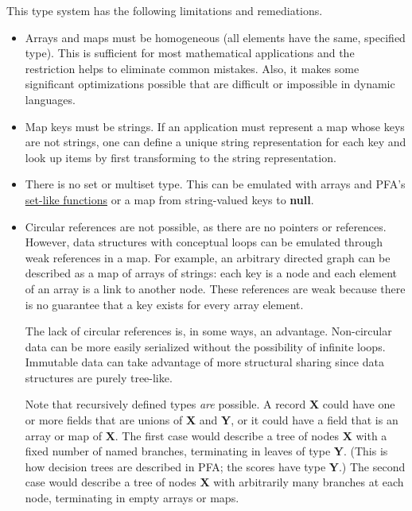\documentclass{article}
\newcommand{\PFAc}{\ttfamily\bfseries}
\newcommand{\PFAtp}{\ttfamily\bfseries}
\theoremstyle{definition}
\begin{document}
\noindent\begin{minipage}{\linewidth}
\indent This type system has the following limitations and remediations.
\begin{itemize}
\item Arrays and maps must be homogeneous (all elements have the same, specified type).  This is sufficient for most mathematical applications and the restriction helps to eliminate common mistakes.  Also, it makes some significant optimizations possible that are difficult or impossible in dynamic languages.
\end{itemize}
\end{minipage}

\vspace{-0.15 cm}
\begin{itemize}
\item Map keys must be strings.  If an application must represent a map whose keys are not strings, one can define a unique string representation for each key and look up items by first transforming to the string representation.

\item There is no set or multiset type.  This can be emulated with arrays and PFA's \hyperlink{hsec:set-like}{set-like functions} or a map from string-valued keys to {\PFAc null}.

\item Circular references are not possible, as there are no pointers or references.  However, data structures with conceptual loops can be emulated through weak references in a map.  For example, an arbitrary directed graph can be described as a map of arrays of strings: each key is a node and each element of an array is a link to another node.  These references are weak because there is no guarantee that a key exists for every array element.

The lack of circular references is, in some ways, an advantage.  Non-circular data can be more easily serialized without the possibility of infinite loops.  Immutable data can take advantage of more structural sharing since data structures are purely tree-like.

Note that recursively defined types {\it are} possible.  A record {\PFAtp X} could have one or more fields that are unions of {\PFAtp X} and {\PFAtp Y}, or it could have a field that is an array or map of {\PFAtp X}.  The first case would describe a tree of nodes {\PFAtp X} with a fixed number of named branches, terminating in leaves of type {\PFAtp Y}.  (This is how decision trees are described in PFA; the scores have type {\PFAtp Y}.)  The second case would describe a tree of nodes {\PFAtp X} with arbitrarily many branches at each node, terminating in empty arrays or maps.


\end{itemize}
\end{document}
